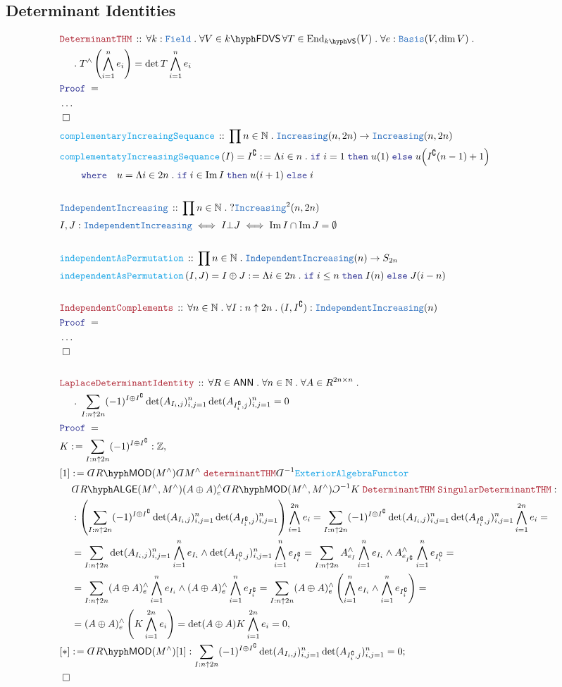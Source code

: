\documentclass[12pt]{scrartcl}%
\newcommand{\TYPE}[1]{\textcolor{NavyBlue}{\mathtt{#1}}}%
\newcommand{\FUNC}[1]{\textcolor{Cerulean}{\mathtt{#1}}}%
\newcommand{\LOGIC}[1]{\textcolor{Blue}{\mathtt{#1}}}%
\newcommand{\THM}[1]{\textcolor{Maroon}{\mathtt{#1}}}%
\renewcommand{\.}{\; . \;} %
\newcommand{\de}{: \kern 0.1pc =} %
\newcommand{\where}{\LOGIC{where}} %
\newcommand{\If}{\LOGIC{if} \;} %
\newcommand{\Then}{ \; \LOGIC{then} \;} %
\newcommand{\Else}{\; \LOGIC{else} \;} %
\newcommand{\Act}[1]{\left( #1 \right)} %
\newcommand{\Theorem}[2]{& \THM{#1} \, :: \, #2 \\ & \Proof = \\ } %
\newcommand{\DeclareType}[2]{& \TYPE{#1} \, :: \, #2 \\}%
\newcommand{\DefineNamedType}[4]{& #1 : \TYPE{#2} \iff #3 \iff #4 \\}%
\newcommand{\DeclareFunc}[2]{& \FUNC{#1} \, :: \, #2 \\}%
\newcommand{\DefineNamedFunc}[4]{&  \FUNC{#1}\Act{#2} = #3 \de #4 \\}%
\newcommand{\NewLine}{\\ & \kern 1pc}%
\newcommand{\Page}[1]{ \begin{align*} #1 \end{align*}  }%
\newcommand{ \bd }{ \ByDef }%
\newcommand{\NoProof}{ & \ldots \\ \EndProof}%
\newcommand{\Int}{\mathbb{Z}}%
\newcommand{\Nat}{\mathbb{N}}%
\DeclareMathOperator*{\im}{Im}%
\newcommand{\End}{\mathrm{End}}%
\renewcommand{\c}{\complement}%
\newcommand{\Say}[3]{& #1 \de #2 : #3, \\} %
\newcommand{\Conclude}[3]{& #1 \de #2 : #3; \\}%
\newcommand{\QED}{\; \square} %
\newcommand{\EndProof}{& \QED \\} %
\newcommand{\ByDef}{\rotatebox[origin=c]{-180}{$D$}}%
\newcommand{\ByConstr}{\rotatebox[origin=c]{-180}{$C$}}%
\newcommand{\Proof}{\LOGIC{Proof} \; } %
\newcommand{\VS}[1]{#1\hyph\mathsf{VS}} %
\newcommand{\FDVS}[1]{#1\hyph\mathsf{FDVS}} %
\newcommand{\LMOD}[1]{#1\hyph\mathsf{MOD}} %
\newcommand{\ANN}{\mathsf{ANN}} %
\newcommand{\LALGE}[1]{#1\hyph\mathsf{ALGE}}%
\begin{document}
\subsection{Determinant Identities}
\Page{
	\Theorem{DeterminantTHM}{\forall k : \TYPE{Field} \. \forall V \in \FDVS{k} \, \forall T \in \End_{\VS{k}}(V) \. 
		\forall e : \TYPE{Basis}(V,\dim V) \.  \NewLine \.  
		T^\wedge\left(\bigwedge^n_{i=1} e_i\right) = \det T \bigwedge^n_{i=1} e_i
	}
	\NoProof
	\DeclareFunc{complementaryIncreaingSequance}{ \prod n \in \Nat \. \TYPE{Increasing}(n,2n) \to \TYPE{Increasing}(n,2n)}
	\DefineNamedFunc{complementatyIncreasingSequance}{I}{I^\c}{ \Lambda i \in n \. \If i = 1 \Then u(1) \Else u\Big(I^\c(n-1)+1\Big) 
		\NewLine \quad \where \quad      
		u = \Lambda i \in 2n \. \If i \in \im I \Then u(i+1) \Else  i
	}
	\\
	\DeclareType{IndependentIncreasing}{\prod n \in \Nat \. ?\TYPE{Increasing}^2(n,2n)}
	\DefineNamedType{I,J}{IndependentIncreasing}{I \bot J}{\im I \cap \im J = \emptyset}
	\\
	\DeclareFunc{independentAsPermutation}{ \prod n \in \Nat \. \TYPE{IndependentIncreasing}(n) \to S_{2n}}
	\DefineNamedFunc{independentAsPermutation}{I,J}{I \oplus J}{ \Lambda i \in 2n \. \If i \le n  \Then I(n) \Else J(i-n)}
	\\
        \Theorem{IndependentComplements}{\forall n \in \Nat \. \forall I : n \uparrow 2n \. (I,I^\c) : \TYPE{IndependentIncreasing}(n)}
	\NoProof
	\\
	\Theorem{LaplaceDeterminantIdentity}
	{
		\forall R \in \ANN \.
		\forall n \in \Nat \. 
		\forall A \in R^{2n \times n} \. \NewLine \. 
		\sum_{I :  n \uparrow 2n }  (-1)^{I \oplus I^\c} \det (A_{I_i,j})^n_{i,j=1} \det (A_{I_i^\c,j})^n_{i,j=1} = 0 
	}
	\Say{K}{ \sum_{I :n \uparrow 2n} (-1)^{I \oplus I^\c}  }{\Int}
	\Say{[1]}
	{
		\bd \LMOD{R}(M^\wedge) \bd M^\wedge \;
		\THM{determinantTHM}
		\bd^{-1} \FUNC{ExteriorAlgebraFunctor} \NewLine
		\bd \LALGE{R}(M^\wedge,M^\wedge)(A\oplus A)^\wedge_e
		\bd \LMOD{R}(M^\wedge,M^\wedge)
		\ByConstr^{-1} K \;
		\THM{DeterminantTHM} \;
		\THM{SingularDeterminantTHM} 
	}
	{
		\NewLine : 
		\left(\sum_{I :  n \uparrow 2n }  (-1)^{I \oplus I^\c} \det (A_{I_i,j})^n_{i,j=1} \det (A_{I_i^\c,j})^n_{i,j=1}\right) \bigwedge^{2n}_{i=1} e_i = 
		\sum_{I :  n \uparrow 2n }  (-1)^{I \oplus I^\c} \det (A_{I_i,j})^n_{i,j=1} \det (A_{I_i^\c,j})^n_{i,j=1} \bigwedge^{2n}_{i=1} e_i = \NewLine =  
		\sum_{I :  n \uparrow 2n }   \det (A_{I_i,j})^n_{i,j=1} \bigwedge^n_{i=1} e_{I_i} \wedge \det (A_{I_i^\c,j})^n_{i,j=1} \bigwedge^{n}_{i=1} e_{I^\c_i} = 	
		\sum_{I :  n \uparrow 2n }   A_{e_I}^\wedge \bigwedge^n_{i=1} e_{I_i} \wedge A_{e_{I^\c}}^\wedge \bigwedge^{n}_{i=1} e_{I^\c_i} = \NewLine =  
		\sum_{I :  n \uparrow 2n }   (A \oplus A )^\wedge_e \bigwedge^n_{i=1} e_{I_i} \wedge (A \oplus A)^\wedge_e \bigwedge^{n}_{i=1} e_{I^\c_i} =  
		\sum_{I :  n \uparrow 2n }   (A \oplus A)^\wedge_e \left( \bigwedge^n_{i=1} e_{I_i}  \wedge  \bigwedge^{n}_{i=1} e_{I^\c_i} \right) =  
		\NewLine =  
		(A \oplus A)_e^\wedge  \left( K  \bigwedge^{2n}_{i=1} e_{ i } \right) = 
		\det (A \oplus A)  K \bigwedge^{2n}_{i=1} e_i
		 = 0
	}
	\Conclude{[*]}{\bd \LMOD{R}(M^\wedge)[1]}{  \sum_{I :  n \uparrow 2n }  (-1)^{I \oplus I^\c} \det (A_{I_i,j})^n_{i,j=1} \det (A_{I_i^\c,j})^n_{i,j=1} = 0} 
	\EndProof  
}
\end{document}
